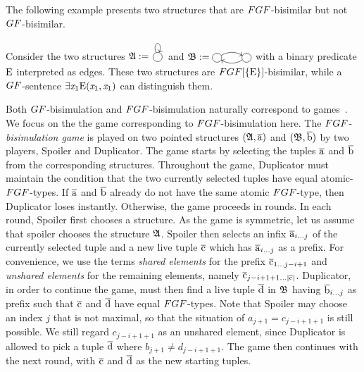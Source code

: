 The following example presents two structures that are $\FGF$-bisimilar but not $\GF$-bisimilar.
\begin{example}
  Consider the two structures $\str{A} := \tikz[baseline=-0.5ex]{\path[->] (0,0) node[draw,circle] (n1) {} (n1) edge[loop above,in=70,out=110,looseness=10] (n1);}$ and $\str{B} := \tikz[baseline=-0.5ex]{\path[->] (0,0) node (n1) [draw,circle] {} (3em,0) node (n2) [draw,circle] {} (n1) edge[bend left] (n2) (n2) edge[bend left] (n1);}$ with a binary predicate $\mathrm{E}$ interpreted as edges. These two structures are $\FGF[\{\relE\}]$-bisimilar, while a $\GF$-sentence $\exists{\mathit{x}_1}\mathrm{E}(\mathit{x}_1,\mathit{x}_1)$ can distinguish them.

\end{example}

Both $\GF$-bisimulation and $\FGF$-bisimulation naturally correspond to games~\cite[Sec. 1.2.1]{Gradel014}.
We focus on the the game corresponding to $\FGF$-bisimulation here.
The $\FGF$-\emph{bisimulation game} is played on two pointed structures $({\mathfrak{A}}, \overline{\mathrm{a}})$ and $({\mathfrak{B}}, \overline{\mathrm{b}})$ by two players, Spoiler and Duplicator.
The game starts by selecting the tuples $\overline{\mathrm{a}}$ and $\overline{\mathrm{b}}$ from the corresponding structures.
Throughout the game, Duplicator must maintain the condition that the two currently selected tuples have equal atomic-$\FGF$-types.
If $\overline{\mathrm{a}}$ and $\overline{\mathrm{b}}$ already do not have the same atomic $\FGF$-type, then Duplicator loses instantly.
Otherwise, the game proceeds in rounds.
In each round, Spoiler first chooses a structure.
As the game is symmetric, let us assume that spoiler chooses the structure ${\mathfrak{A}}$.
Spoiler then selects an infix $\overline{\mathrm{a}}_{i\ldots j}$ of the currently selected tuple and a new live tuple $\overline{\mathrm{c}}$ which has $\overline{\mathrm{a}}_{i\ldots j}$ as a prefix.
For convenience, we use the terms \emph{shared elements} for the prefix $\overline{\mathrm{c}}_{1\ldots j-i+1}$ and \emph{unshared elements} for the remaining elements, namely $\overline{\mathrm{c}}_{j-i+1+1\ldots|\overline{\mathrm{c}}|}$.
Duplicator, in order to continue the game, must then find a live tuple $\overline{\mathrm{d}}$ in ${\mathfrak{B}}$ having $\overline{\mathrm{b}}_{i\ldots j}$ as prefix such that $\overline{\mathrm{c}}$ and $\overline{\mathrm{d}}$ have equal $\FGF$-types.
Note that Spoiler may choose an index $j$ that is not maximal, so that the situation of $a_{j+1} = c_{j-i+1+1}$ is still possible.
We still regard $c_{j-i+1+1}$ as an unshared element, since Duplicator is allowed to pick a tuple $\overline{\mathrm{d}}$ where $b_{j+1} \neq d_{j-i+1+1}$.
The game then continues with the next round, with $\overline{\mathrm{c}}$ and $\overline{\mathrm{d}}$ as the new starting tuples.
